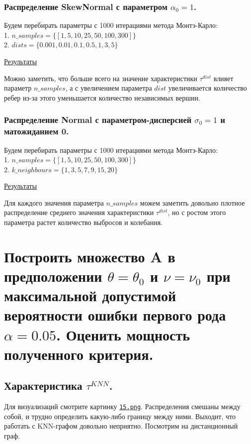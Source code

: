 \documentclass{report}
\begin{document}
\subsection{Распределение SkewNormal с параметром $\alpha_0=1$.}
Будем перебирать параметры с 1000 итерациями метода Монтэ-Карло:\\
1. $n\_samples = \{[1, 5, 10, 25, 50, 100, 300]\}$\\
2. $dists = \{0.001, 0.01, 0.1, 0.5, 1, 3, 5\}$

\href{https://github.com/misshimichka/dm-random-graphs/blob/dmitrii/report/report/fix_alpha_skewnorm_mis_dist.png}{Результаты}

Можно заметить, что больше всего на значение характеристики $\tau^{dist}$ влияет параметр $n\_samples$, а с увеличением параметра $dist$ увеличивается количество ребер из-за этого уменьшается количество независимых вершин. 

\subsection{Распределение Normal с параметром-дисперсией $\sigma_0=1$ и матожиданием 0.}
Будем перебирать параметры с 1000 итерациями метода Монтэ-Карло:\\
1. $n\_samples = \{[1, 5, 10, 25, 50, 100, 300]\}$\\
2. $k\_neighbours = \{1, 3, 5, 7, 9, 15, 20\}$

\href{https://github.com/misshimichka/dm-random-graphs/blob/dmitrii/report/report/fix_sigma_norm_mis_dist.png}{Результаты}

Для каждого значения параметра $n\_samples$ можем заметить довольно плотное распределение среднего значения характеристики $\tau^{dist}$, но с ростом этого параметра растет количество выбросов и колебания.

\chapter{Построить множество A в предположении $\theta = \theta_0$ и $\nu = \nu_0$ при максимальной допустимой вероятности ошибки первого рода $\alpha = 0.05$. Оценить мощность полученного критерия.}
\section{Характеристика $\tau^{KNN}$.}
Для визуализаций смотрите картинку \texttt{\href{https://github.com/misshimichka/dm-random-graphs/blob/report/report/15.png}{15.png}}.
\newline
\newline
Распределения смешаны между собой, и трудно определить какую-либо границу между ними. Выходит, что работать с KNN-графом довольно неприятно. Посмотрим на дистанционный граф.
\end{document}
